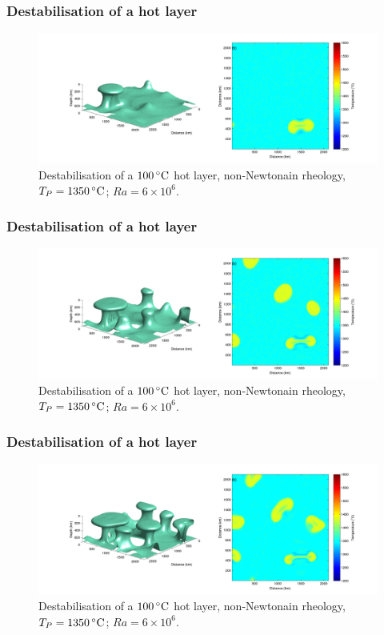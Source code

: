 \documentclass[aspectratio=169]{beamer}
\begin{document}
\begin{frame}
    \frametitle{Destabilisation of a hot layer}
    \begin{figure}
        \vspace{-.5cm}
        \includegraphics[width=0.85\paperwidth]{./figures/100hot/100hotbase_2.png}
        \caption{Destabilisation of a $100\rm\,^{\circ}C$ hot layer, non-Newtonain rheology, $T_{P}=1350\rm\,^{\circ}C$; $Ra = 6\times10^{6}$.}
    \end{figure}
\end{frame}

\begin{frame}
    \frametitle{Destabilisation of a hot layer}
    \begin{figure}
        \vspace{-.5cm}
        \includegraphics[width=0.85\paperwidth]{./figures/100hot/100hotbase_3.png}
        \caption{Destabilisation of a $100\rm\,^{\circ}C$ hot layer, non-Newtonain rheology, $T_{P}=1350\rm\,^{\circ}C$; $Ra = 6\times10^{6}$.}
    \end{figure}
\end{frame}

\begin{frame}
    \frametitle{Destabilisation of a hot layer}
    \begin{figure}
        \vspace{-.5cm}
        \includegraphics[width=0.85\paperwidth]{./figures/100hot/100hotbase_4.png}
        \caption{Destabilisation of a $100\rm\,^{\circ}C$ hot layer, non-Newtonain rheology, $T_{P}=1350\rm\,^{\circ}C$; $Ra = 6\times10^{6}$.}
    \end{figure}
\end{frame}
\end{document}
